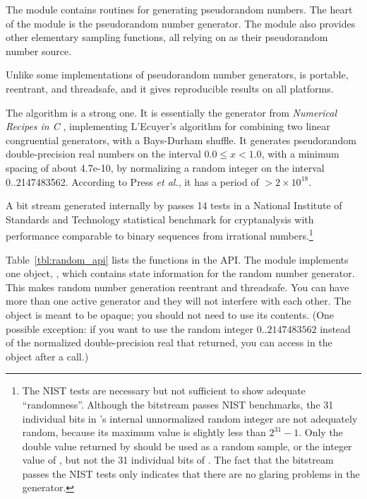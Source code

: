 The  module contains routines for generating
pseudorandom numbers. The heart of the module is the
 pseudorandom number generator. The module also
provides other elementary sampling functions, all relying on
 as their pseudorandom number source.  

Unlike some implementations of pseudorandom number generators,
 is portable, reentrant, and threadsafe, and it
gives reproducible results on all platforms.

The  algorithm is a strong one. It is essentially
the  generator from \emph{Numerical Recipes in C}
\citep{Press93}, implementing L'Ecuyer's algorithm for combining two
linear congruential generators, with a Bays-Durham shuffle. It
generates pseudorandom double-precision real numbers on the interval
$0.0 \leq x < 1.0$, with a minimum spacing of about 4.7e-10, by
normalizing a random integer on the interval 0..2147483562.  According
to Press \emph{et al.}, it has a period of $> 2 \times
10^{18}$. 

A bit stream generated internally by  passes 14
tests in a National Institute of Standards and Technology statistical
benchmark for cryptanalysis \citep{Rukhin01} with performance
comparable to binary sequences from irrational numbers.\footnote{The
NIST tests are necessary but not sufficient to show adequate
``randomness''. Although the bitstream passes NIST benchmarks, the 31
individual bits in 's internal unnormalized
random integer are not adequately random, because its maximum value is
slightly less than $2^{31}-1$. Only the double value returned by
 should be used as a random sample, or the
integer value of , but not the 31 individual bits of
.  The fact that the bitstream passes the NIST tests
only indicates that there are no glaring problems in the generator.}

Table~\ref{tbl:random_api} lists the functions in the 
API. The module implements one object, , which
contains state information for the random number generator.  This
makes random number generation reentrant and threadsafe. You can have
more than one active generator and they will not interfere with each
other. The object is meant to be opaque; you should not need to use
its contents.  (One possible exception: if you want to use the random
integer $0..2147483562$ instead of the normalized double-precision
real that  returned, you can access
 in the  object  after a
 call.)

